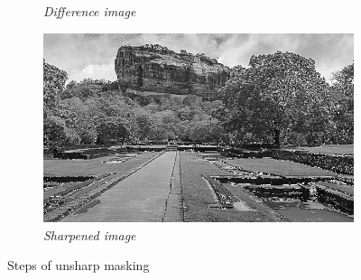 \documentclass[11pt, a4paper]{article}
\begin{document}
\begin{figure}[H]
\begin{subfigure}[b]{0.24\textwidth}
		\caption{{\small \textit{Difference image}}}
		\label{fig:Undiff Image}
	\end{subfigure}
	\hfill
	\begin{subfigure}[b]{0.24\textwidth}
		\centering
		\includegraphics[width=\textwidth]{./Outputs/Unsharp_Image.png}
		\caption{{\small \textit{Sharpened image}}}
		\label{fig:Unsharp Image}
	\end{subfigure}
	\caption{Steps of unsharp masking}
\end{figure}
\end{document}

